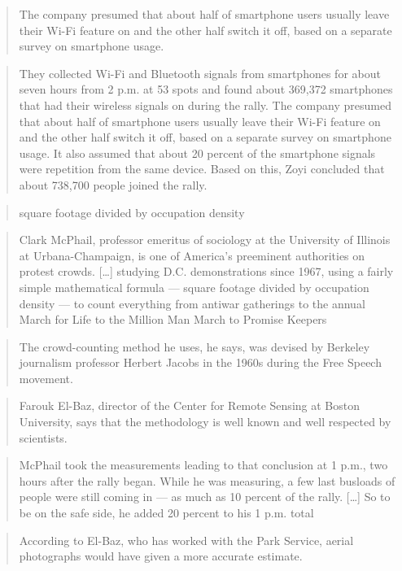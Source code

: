 \blockcquote{2016DemonstrationsInSeoul}{%
  The company presumed that about half of smartphone users usually leave their 
  Wi-Fi feature on and the other half switch it off, based on a separate survey 
  on smartphone usage.%
}

\blockcquote{2016DemonstrationsInSeoul}{%
  They collected Wi-Fi and Bluetooth signals from smartphones for about seven 
  hours from 2 p.m. at 53 spots and found about 369,372 smartphones that had 
  their wireless signals on during the rally. The company presumed that about 
  half of smartphone users usually leave their Wi-Fi feature on and the other 
  half switch it off, based on a separate survey on smartphone usage. It also 
  assumed that about 20 percent of the smartphone signals were repetition from 
  the same device. Based on this, Zoyi concluded that about 738,700 people 
  joined the rally.%
}

\blockcquote{TheCrowdNumbersGame}{%
  square footage divided by occupation density%
}

\blockcquote{TheCrowdNumbersGame}{%
  Clark McPhail, professor emeritus of sociology at the University of Illinois at 
  Urbana-Champaign, is one of America’s preeminent authorities on protest crowds.
  [\dots]
  studying D.C. demonstrations since 1967, using a fairly simple mathematical 
  formula --- square footage divided by occupation density --- to count 
  everything from antiwar gatherings to the annual March for Life to the 
  Million Man March to Promise Keepers%
}

\blockcquote{TheCrowdNumbersGame}{%
  The crowd-counting method he uses, he says, was devised by Berkeley 
  journalism professor Herbert Jacobs in the 1960s during the Free Speech 
  movement.%
}

\blockcquote{TheCrowdNumbersGame}{%
  Farouk El-Baz, director of the Center for Remote Sensing at Boston 
  University, says that the methodology is well known and well respected by 
  scientists.%
}

\blockcquote{TheCrowdNumbersGame}{%
  McPhail took the measurements leading to that conclusion at 1 p.m., two hours 
  after the rally began. While he was measuring, a few last busloads of people 
  were still coming in --- as much as 10 percent of the rally.
  [\dots]
  So to be on the safe side, he added 20 percent to his 1 p.m. total%
}

\blockcquote{TheCrowdNumbersGame}{%
  According to El-Baz, who has worked with the Park Service, aerial photographs 
  would have given a more accurate estimate.%
}

